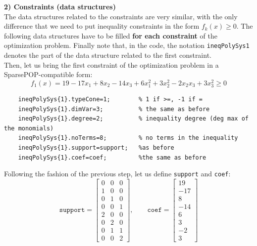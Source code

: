 \noindent
\textbf{\textsf{2) Constraints (data structures)}}\\
The data structures related to the constraints are very similar, with the only difference that we need to put inequality constraints in the form $f_k(x)\ge0$. The following data structures have to be filled \textbf{for each constraint} of the optimization problem. Finally note that, in the code, the notation \texttt{ineqPolySys{1}} denotes the part of the data structure related to the first constraint.\\
Then, let us bring the first constraint of the optimization problem in a SparsePOP-compatible form:
\begin{equation*}
    f_1(x)=19-17x_1+8x_2-14x_3+6x_1^2+3x_2^2-2x_2x_3 +3x_3^2 \ge 0 
\end{equation*}
\begin{verbatim}
    ineqPolySys{1}.typeCone=1;        % 1 if >=, -1 if =
    ineqPolySys{1}.dimVar=3;          % the same as before
    ineqPolySys{1}.degree=2;          % inequality degree (deg max of the monomials)
    ineqPolySys{1}.noTerms=8;         % no terms in the inequality
    ineqPolySys{1}.support=support;   %as before
    ineqPolySys{1}.coef=coef;         %the same as before
\end{verbatim}

\noindent
Following the fashion of the previous step, let us define \texttt{support} and \texttt{coef}: 
\begin{equation*}
    \texttt{support} = \begin{bmatrix}
        0&0&0\\1&0&0\\
        0&1&0\\0&0&1\\
        2&0&0\\0&2&0\\
        0&1&1\\0&0&2
    \end{bmatrix}, \qquad 
    \texttt{coef} = \begin{bmatrix}
        19\\-17\\8\\-14\\
        6\\3\\-2\\3
    \end{bmatrix}
\end{equation*}

